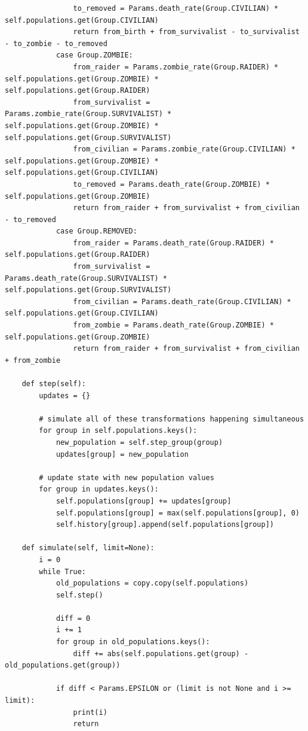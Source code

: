\documentclass{article}
\begin{document}
\begin{lstlisting}
                to_removed = Params.death_rate(Group.CIVILIAN) * self.populations.get(Group.CIVILIAN)
                return from_birth + from_survivalist - to_survivalist - to_zombie - to_removed
            case Group.ZOMBIE:
                from_raider = Params.zombie_rate(Group.RAIDER) * self.populations.get(Group.ZOMBIE) * self.populations.get(Group.RAIDER)
                from_survivalist = Params.zombie_rate(Group.SURVIVALIST) * self.populations.get(Group.ZOMBIE) * self.populations.get(Group.SURVIVALIST)
                from_civilian = Params.zombie_rate(Group.CIVILIAN) * self.populations.get(Group.ZOMBIE) * self.populations.get(Group.CIVILIAN)
                to_removed = Params.death_rate(Group.ZOMBIE) * self.populations.get(Group.ZOMBIE)
                return from_raider + from_survivalist + from_civilian - to_removed
            case Group.REMOVED:
                from_raider = Params.death_rate(Group.RAIDER) * self.populations.get(Group.RAIDER)
                from_survivalist = Params.death_rate(Group.SURVIVALIST) * self.populations.get(Group.SURVIVALIST)
                from_civilian = Params.death_rate(Group.CIVILIAN) * self.populations.get(Group.CIVILIAN)
                from_zombie = Params.death_rate(Group.ZOMBIE) * self.populations.get(Group.ZOMBIE)
                return from_raider + from_survivalist + from_civilian + from_zombie
            
    def step(self):
        updates = {}

        # simulate all of these transformations happening simultaneous
        for group in self.populations.keys():
            new_population = self.step_group(group)
            updates[group] = new_population

        # update state with new population values
        for group in updates.keys():
            self.populations[group] += updates[group]
            self.populations[group] = max(self.populations[group], 0)
            self.history[group].append(self.populations[group])

    def simulate(self, limit=None):
        i = 0
        while True:
            old_populations = copy.copy(self.populations)
            self.step()

            diff = 0
            i += 1
            for group in old_populations.keys():
                diff += abs(self.populations.get(group) - old_populations.get(group))

            if diff < Params.EPSILON or (limit is not None and i >= limit):
                print(i)
                return


\end{lstlisting}
\end{document}
